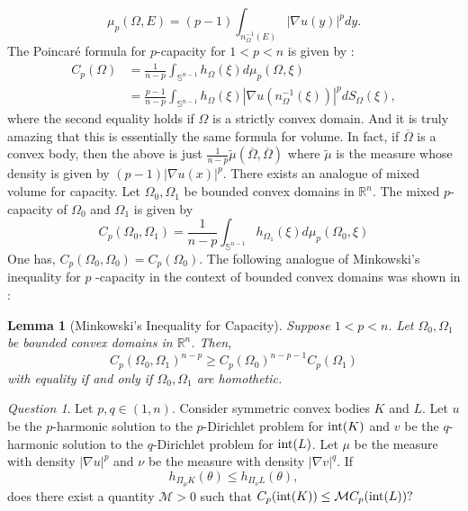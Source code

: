 \documentclass[11pt]{amsart}
\newtheorem{lemma}[theorem]{Lemma}
\theoremstyle{definition}
\theoremstyle{remark}
\newtheorem{question}[theorem]{Question}
\numberwithin{equation}{section}
\newcommand{\R}{\mathbb{R}}
\newcommand{\s}{\mathbb{S}}
\begin{document}
 $$\mu_p(\Omega,E)=(p-1)\int_{n_\Omega^{-1}(E)}|\nabla u(y)|^p dy.$$
The Poincar{\'e} formula for $p$-capacity for $1<p<n$ is given by \cite{CNSXYZ15}:
 \begin{equation*}
 \begin{split}
     C_p(\Omega)&=\frac{1}{n-p}\int_{\s^{n-1}}h_{\Omega}(\xi)d\mu_p(\Omega,\xi)
     \\
     &=\frac{p-1}{n-p}\int_{\s^{n-1}}h_{\Omega}(\xi)|\nabla u(n_\Omega^{-1}(\xi))|^p dS_\Omega(\xi),
     \end{split}
 \end{equation*}
 where the second equality holds if $\Omega$ is a strictly convex domain. And it is truly amazing that this is essentially the same formula for volume. In fact, if $\overline{\Omega}$ is a convex body, then the above is just $\frac{1}{n-p}\tilde{\mu}(\overline{\Omega},\overline{\Omega})$ where $\tilde{\mu}$ is the measure whose density is given by $(p-1)|\nabla u(x)|^p$. There exists an analogue of mixed volume for capacity. Let $\Omega_{0}, \Omega_{1}$ be bounded convex domains in $\R^{n}$. The mixed $p$-capacity of $\Omega_{0}$ and $\Omega_{1}$ is given by
$$
C_{p}\left(\Omega_{0}, \Omega_{1}\right)=\frac{1}{n-p} \int_{\s^{n-1}} h_{\Omega_{1}}(\xi) d \mu_{p}\left(\Omega_{0}, \xi\right)
$$
One has, $C_{p}\left(\Omega_{0}, \Omega_{0}\right)=C_{p}\left(\Omega_{0}\right) .$ The following analogue of Minkowski's inequality for $p$ -capacity in the context of bounded convex domains was shown in \cite{CNSXYZ15}:

\begin{lemma}[Minkowski's Inequality for Capacity]
\label{l:min_cap}
Suppose $1<p<n .$ Let $\Omega_{0}, \Omega_{1}$ be bounded convex domains in $\R^{n}$. Then,
$$
C_{p}\left(\Omega_{0}, \Omega_{1}\right)^{n-p} \geq C_{p}\left(\Omega_{0}\right)^{n-p-1} C_{p}\left(\Omega_{1}\right)
$$
with equality if and only if $\Omega_{0}, \Omega_{1}$ are homothetic.
\end{lemma}

  \begin{question}
 \label{q:cap}
 Let $p,q\in (1,n)$. Consider symmetric convex bodies $K$ and $L$. Let $u$ be the $p$-harmonic solution to the $p$-Dirichlet problem for $\textnormal{int}(K)$ and $v$ be the $q$-harmonic solution to the $q$-Dirichlet problem for $\textnormal{int}(L)$. Let $\mu$ be the measure with density $|\nabla u|^p$ and $\nu$ be the measure with density $|\nabla v|^q$. If
 $$h_{\Pi_\mu K} (\theta)\leq h_{\Pi_\nu L} (\theta),$$
 does there exist a quantity $\mathcal{M}>0$ such that
 $C_p(\textnormal{int} (K))\leq \mathcal{M}C_p(\textnormal{int}(L))?$
 \end{question}
\end{document}
